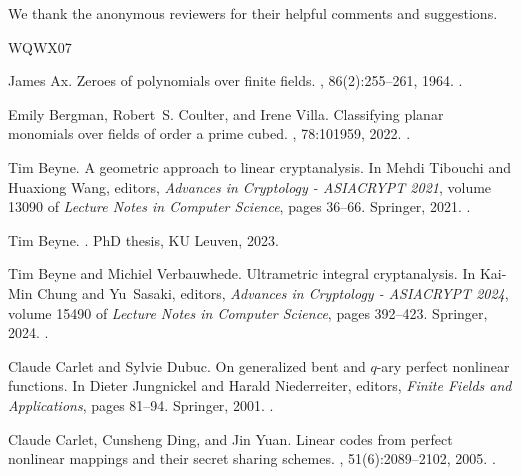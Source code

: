 \documentclass[12pt]{article}
\begin{document}
We thank the anonymous reviewers for their helpful comments and suggestions.

\begin{thebibliography}{WQWX07}

James Ax.
\newblock Zeroes of polynomials over finite fields.
, 86(2):255--261, 1964.
\newblock \href {https://doi.org/10.2307/2373163} {}.

Emily Bergman, Robert~S. Coulter, and Irene Villa.
\newblock Classifying planar monomials over fields of order a prime cubed.
, 78:101959, 2022.
\newblock \href {https://doi.org/10.1016/J.FFA.2021.101959}
  {}.

Tim Beyne.
\newblock A geometric approach to linear cryptanalysis.
\newblock In Mehdi Tibouchi and Huaxiong Wang, editors, {\em Advances in
  Cryptology - {ASIACRYPT} 2021}, volume 13090 of {\em Lecture Notes in
  Computer Science}, pages 36--66. Springer, 2021.
\newblock \href {https://doi.org/10.1007/978-3-030-92062-3_2}
  {}.

Tim Beyne.
.
\newblock PhD thesis, KU Leuven, 2023.

Tim Beyne and Michiel Verbauwhede.
\newblock Ultrametric integral cryptanalysis.
\newblock In Kai{-}Min Chung and Yu~Sasaki, editors, {\em Advances in
  Cryptology - {ASIACRYPT} 2024}, volume 15490 of {\em Lecture Notes in
  Computer Science}, pages 392--423. Springer, 2024.
\newblock \href {https://doi.org/10.1007/978-981-96-0941-3_13}
  {}.

Claude Carlet and Sylvie Dubuc.
\newblock On generalized bent and $q$-ary perfect nonlinear functions.
\newblock In Dieter Jungnickel and Harald Niederreiter, editors, {\em Finite
  Fields and Applications}, pages 81--94. Springer, 2001.
\newblock \href {https://doi.org/10.1007/978-3-642-56755-1_8}
  {}.

Claude Carlet, Cunsheng Ding, and Jin Yuan.
\newblock Linear codes from perfect nonlinear mappings and their secret sharing
  schemes.
, 51(6):2089--2102, 2005.
\newblock \href {https://doi.org/10.1109/TIT.2005.847722}
  {}.


\end{thebibliography}
\end{document}

